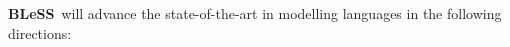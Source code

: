 \documentclass[a4paper,11pt]{article}
\newcommand{\project}[1]{\textbf{#1}\xspace}
\newcommand{\BLESS}{\project{BLeSS}}
\newcommand{\TheProject}{\BLESS}
\begin{document}





\TheProject{}\ will advance the state-of-the-art in modelling languages in
the following directions:
\end{document}
